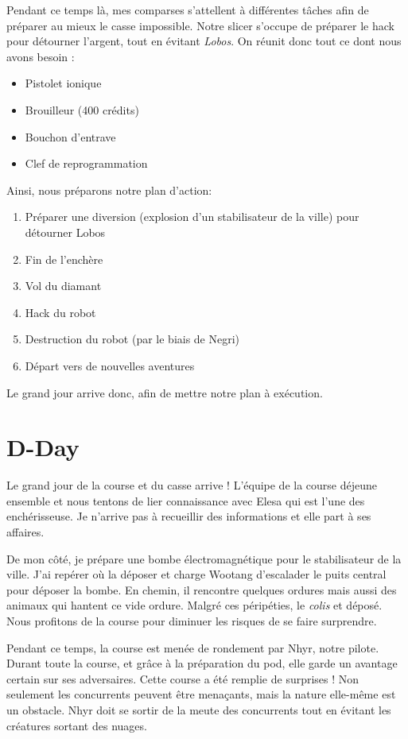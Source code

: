 \documentclass[a4paper,9pt,twoside,twocolumn,openany]{book}
\begin{document}
Pendant ce temps là, mes comparses s'attellent à différentes tâches afin de préparer au mieux le casse impossible. Notre slicer s'occupe de préparer le hack pour détourner l'argent, tout en évitant \emph{Lobos}. On réunit donc tout ce dont nous avons besoin :
\begin{itemize}
\item Pistolet ionique
\item Brouilleur (400 crédits)
\item Bouchon d'entrave
\item Clef de reprogrammation
\end{itemize}

Ainsi, nous préparons notre plan d'action:
\begin{enumerate}
\item Préparer une diversion (explosion d'un stabilisateur de la ville) pour détourner Lobos
\item Fin de l'enchère
\item Vol du diamant
\item Hack du robot
\item Destruction du robot (par le biais de Negri)
\item Départ vers de nouvelles aventures
\end{enumerate}

Le grand jour arrive donc, afin de mettre notre plan à exécution.

\section{D-Day}
\subtitle{17 février 2019}

Le grand jour de la course et du casse arrive ! L'équipe de la course déjeune ensemble et nous tentons de lier connaissance avec Elesa qui est l'une des enchérisseuse. Je n'arrive pas à recueillir des informations et elle part à ses affaires.

De mon côté, je prépare une bombe électromagnétique pour le stabilisateur de la ville. J'ai repérer où la déposer et charge Wootang d'escalader le puits central pour déposer la bombe. En chemin, il rencontre quelques ordures mais aussi des animaux qui hantent ce vide ordure. Malgré ces péripéties, le \emph{colis} et déposé. Nous profitons de la course pour diminuer les risques de se faire surprendre.

Pendant ce temps, la course est menée de rondement par Nhyr, notre pilote. Durant toute la course, et grâce à la préparation du pod, elle garde un avantage certain sur ses adversaires. Cette course a été remplie de surprises ! Non seulement les concurrents peuvent être menaçants, mais la nature elle-même est un obstacle. Nhyr doit se sortir de la meute des concurrents tout en évitant les créatures sortant des nuages.
\end{document}
